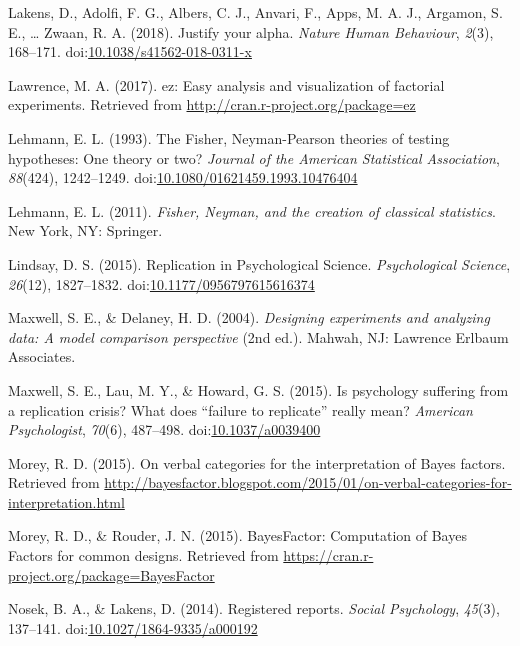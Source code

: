 \documentclass[,man, mask]{apa6}
\begin{document}
\leavevmode\hypertarget{ref-Lakens2017}{}%
Lakens, D., Adolfi, F. G., Albers, C. J., Anvari, F., Apps, M. A. J., Argamon, S. E., \ldots{} Zwaan, R. A. (2018). Justify your alpha. \emph{Nature Human Behaviour}, \emph{2}(3), 168--171. doi:\href{https://doi.org/10.1038/s41562-018-0311-x}{10.1038/s41562-018-0311-x}

\leavevmode\hypertarget{ref-Lawrence2017}{}%
Lawrence, M. A. (2017). ez: Easy analysis and visualization of factorial experiments. Retrieved from \url{http://cran.r-project.org/package=ez}

\leavevmode\hypertarget{ref-Lehmann1993}{}%
Lehmann, E. L. (1993). The Fisher, Neyman-Pearson theories of testing hypotheses: One theory or two? \emph{Journal of the American Statistical Association}, \emph{88}(424), 1242--1249. doi:\href{https://doi.org/10.1080/01621459.1993.10476404}{10.1080/01621459.1993.10476404}

\leavevmode\hypertarget{ref-Lehmann2011}{}%
Lehmann, E. L. (2011). \emph{Fisher, Neyman, and the creation of classical statistics}. New York, NY: Springer.

\leavevmode\hypertarget{ref-Lindsay2015}{}%
Lindsay, D. S. (2015). Replication in Psychological Science. \emph{Psychological Science}, \emph{26}(12), 1827--1832. doi:\href{https://doi.org/10.1177/0956797615616374}{10.1177/0956797615616374}

\leavevmode\hypertarget{ref-Maxwell2004}{}%
Maxwell, S. E., \& Delaney, H. D. (2004). \emph{Designing experiments and analyzing data: A model comparison perspective} (2nd ed.). Mahwah, NJ: Lawrence Erlbaum Associates.

\leavevmode\hypertarget{ref-Maxwell2015}{}%
Maxwell, S. E., Lau, M. Y., \& Howard, G. S. (2015). Is psychology suffering from a replication crisis? What does ``failure to replicate'' really mean? \emph{American Psychologist}, \emph{70}(6), 487--498. doi:\href{https://doi.org/10.1037/a0039400}{10.1037/a0039400}

\leavevmode\hypertarget{ref-Morey2015c}{}%
Morey, R. D. (2015). On verbal categories for the interpretation of Bayes factors. Retrieved from \url{http://bayesfactor.blogspot.com/2015/01/on-verbal-categories-for-interpretation.html}

\leavevmode\hypertarget{ref-Morey2015b}{}%
Morey, R. D., \& Rouder, J. N. (2015). BayesFactor: Computation of Bayes Factors for common designs. Retrieved from \url{https://cran.r-project.org/package=BayesFactor}

\leavevmode\hypertarget{ref-Nosek2014}{}%
Nosek, B. A., \& Lakens, D. (2014). Registered reports. \emph{Social Psychology}, \emph{45}(3), 137--141. doi:\href{https://doi.org/10.1027/1864-9335/a000192}{10.1027/1864-9335/a000192}
\end{document}
